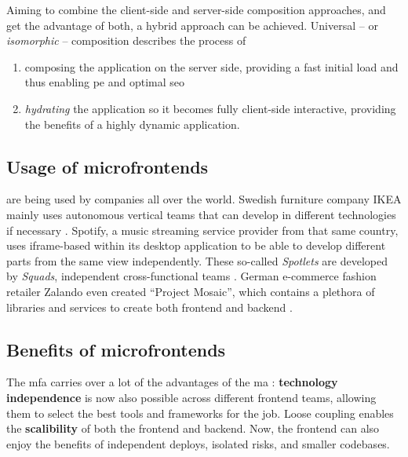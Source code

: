 Aiming to combine the client-side and server-side composition approaches, and
get the advantage of both, a hybrid approach can be achieved. Universal -- or
\textit{isomorphic} -- composition describes the process of 
\begin{enumerate}
  \item composing the application on the server side, providing a fast initial
  load and thus enabling \gls{pe} and optimal \gls{seo}
  \item \textit{hydrating} the application so it becomes fully client-side
  interactive, providing the benefits of a highly dynamic application.
\end{enumerate}


\subsection{Usage of microfrontends}

 are being used by companies all over the world.
Swedish furniture company IKEA mainly uses autonomous vertical teams that can
develop in different technologies if necessary \autocite{Stenberg_2018}.
Spotify, a music streaming service provider from that same country, uses
\gls{iframe}-based  within its desktop application to
be able to develop different parts from the same view independently. These
so-called \textit{Spotlets} are developed by \textit{Squads}, independent
cross-functional teams \autocite{Gall_2018}. German e-commerce fashion retailer
Zalando even created ``Project Mosaic'',
which contains a plethora of libraries and services to create both
\gls{frontend} and \gls{backend} .



\subsection{Benefits of microfrontends}

The \gls{mfa} carries over a lot of the advantages of the \gls{ma}
\autocite{Jackson_2019}: \textbf{technology independence} is now also possible
across different \gls{frontend} teams, allowing them to select the best tools
and frameworks for the job. Loose coupling enables the \textbf{scalibility} of
both the \gls{frontend} and \gls{backend}. Now, the \gls{frontend} can also
enjoy the benefits of independent deploys, isolated risks, and smaller
codebases.

